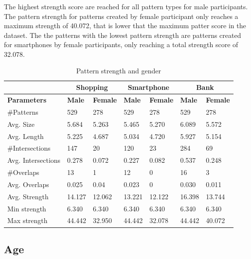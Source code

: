     The highest strength score are reached for all pattern types for male participants. The pattern strength for patterns created by female participant only reaches a maximum strength of 40.072, that is lower that the maximum patter score in the dataset. The the patterns with the lowest pattern strength are patterns created for smartphones by female participants, only reaching a total strength score of 32.078. 

    \begin{table}[H]
      \centering
      \begin{tabular}{l || l | l || l | l || l | l }
        \hline
         & \multicolumn{2}{c||}{\bf Shopping} & \multicolumn{2}{c||}{\bf Smartphone} &\multicolumn{2}{c}{\bf Bank} \\ \hline
        {\bf Parameters}   & {\bf Male} & {\bf Female} & {\bf Male} & {\bf Female} & {\bf Male} & {\bf Female}\\ \hline
        \#Patterns         & 529    & 278    & 529    & 278    & 529    & 278    \\
        Avg. Size          & 5.684  & 5.263  & 5.465  & 5.270  & 6.089  & 5.572  \\
        Avg. Length        & 5.225  & 4.687  & 5.034  & 4.720  & 5.927  & 5.154  \\
        \#Intersections    & 147    & 20     & 120    & 23     & 284    & 69     \\
        Avg. Intersections & 0.278  & 0.072  & 0.227  & 0.082  & 0.537  & 0.248  \\
        \#Overlaps         & 13     & 1      & 12     & 0      & 16     & 3      \\
        Avg. Overlaps      & 0.025  & 0.04   & 0.023  & 0      & 0.030  & 0.011  \\ \hline
        Avg. Strength      & 14.127 & 12.062 & 13.221 & 12.122 & 16.398 & 13.744 \\ 
        Min strength       & 6.340  & 6.340  & 6.340  & 6.340  & 6.340  & 6.340  \\
        Max strength       & 44.442 & 32.950  & 44.442 & 32.078 & 44.442 & 40.072 \\ \hline
      \end{tabular}
      \caption{Pattern strength and gender }
      \label{tab:gendertrength}
    \end{table}

	\subsection{Age}

